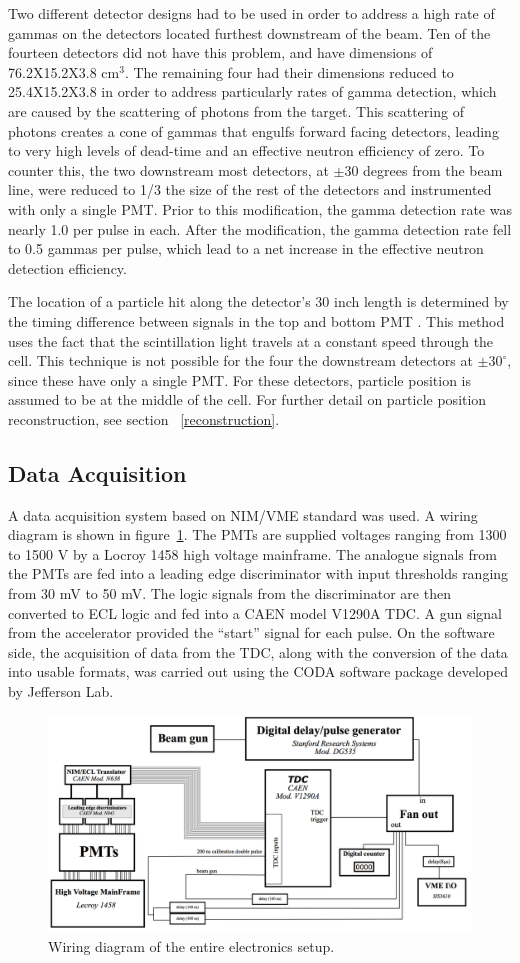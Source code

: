 Two different detector designs had to be used in order to address a high rate of gammas on the detectors located furthest downstream of the beam.
Ten of the fourteen detectors did not have this problem, and have dimensions of 76.2X15.2X3.8 cm$^3$.
The remaining four had their dimensions reduced to 25.4X15.2X3.8 in order to address particularly rates of gamma detection, which are caused by the scattering of photons from the target.
This scattering of photons creates a cone of gammas that engulfs forward facing detectors, leading to very high levels of dead-time and an effective neutron efficiency of zero.
To counter this, the two downstream most detectors, at $\pm$30 degrees from the beam line, were reduced to 1/3 the size of the rest of the detectors and instrumented with only a single PMT.
Prior to this modification, the gamma detection rate was nearly 1.0 per pulse in each.
After the modification, the gamma detection rate fell to 0.5 gammas per pulse, which lead to a net increase in the effective neutron detection efficiency.

The location of a particle hit along the detector's 30 inch length is determined by the timing difference between signals in the top and bottom PMT .
This method uses the fact that the scintillation light travels at a constant speed through the cell.
This technique is not possible for the four the downstream detectors at $\pm 30^{\circ}$, since these have only a single PMT.
For these detectors, particle position is assumed to be at the middle of the cell.
For further detail on particle position reconstruction, see section ~\ref{reconstruction}.

\subsection{Data Acquisition}
A data acquisition system based on NIM/VME standard was used.
A wiring diagram is shown in figure~\ref{fig:WiringDiagram}.
The PMTs are supplied voltages ranging from 1300 to 1500 V by a Locroy 1458 high voltage mainframe.
The analogue signals from the PMTs are fed into a leading edge discriminator with input thresholds ranging from 30 mV to 50 mV.
The logic signals from the discriminator are then converted to ECL logic and fed into a CAEN model V1290A TDC.
A gun signal from the accelerator provided the “start” signal for each pulse.
On the software side, the acquisition of data from the TDC, along with the conversion of the data into usable formats, was carried out using the CODA software package developed by Jefferson Lab.  

\begin{figure}[h]
\includegraphics[width=\textwidth]{Content/Methods/WiringDiagram.png}
\caption{Wiring diagram of the entire electronics setup. }
\label{fig:WiringDiagram}
\end{figure}